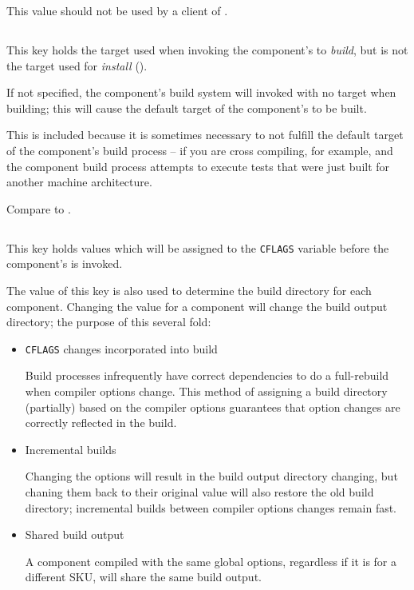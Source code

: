 This value should not be used by a client of \lmsbw.


\subsection{}\label{variables:build-target}

This key holds the target used when invoking the component's \makefile
to \emph{build}, but is not the target used for \emph{install}
().

If not specified, the component's build system will invoked with no
target when building; this will cause the default target of the
component's \makefile to be built.

This is included because it is sometimes necessary to not fulfill the
default target of the component's build process -- if you are cross
compiling, for example, and the component build process attempts to
execute tests that were just built for another machine architecture.

Compare to .

\label{variables:build-target}

\subsection{}\label{variables:cflags}

This key holds values which will be assigned to the \texttt{CFLAGS}
variable before the component's \makefile is invoked.

The value of this key is also used to determine the build directory
for each component.  Changing the value for a component will change
the build output directory; the purpose of this several fold:

\begin{itemize}
\item \texttt{CFLAGS} changes incorporated into build

  Build processes infrequently have correct dependencies to do a
  full-rebuild when compiler options change.  This method of assigning
  a build directory (partially) based on the compiler options
  guarantees that option changes are correctly reflected in the build.

\item Incremental builds

  Changing the options will result in the build output directory
  changing, but chaning them back to their original value will also
  restore the old build directory; incremental builds between compiler
  options changes remain fast.

\item Shared build output

  A component compiled with the same global options, regardless if it
  is for a different SKU, will share the same build output.

\end{itemize}

